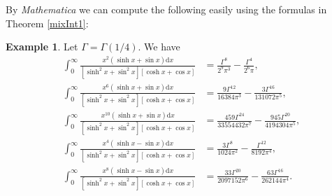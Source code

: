 \documentclass[11pt]{article}
\theoremstyle{plain}
\theoremstyle{definition}
\newtheorem{exa}[thm]{Example}
\begin{document}
By \emph{Mathematica} we can compute the following easily using the formulas in Theorem \ref{mixInt1}:
\begin{exa}\label{ExampleC}
Let $\Gamma=\Gamma(1/4)$. We have
	\begin{align}
	\int_0^{\infty}{\frac{x^2\left( \sinh x+\sin x \right) \mathrm{d}x}{\left[ \sinh ^2x+\sin ^2x \right] \left[ \cosh x+\cos x \right]}}&=\frac{\Gamma ^8}{2^9\pi ^3}-\frac{\Gamma ^4}{2^6\pi},
	\nonumber\\
	\int_0^{\infty}{\frac{x^6\left( \sinh x+\sin x \right) \mathrm{d}x}{\left[ \sinh ^2x+\sin ^2x \right] \left[ \cosh x+\cos x \right]}}&=\frac{9\Gamma  ^{12}}{16384\pi ^3}-\frac{3\Gamma  ^{16}}{131072\pi ^5},
	\nonumber\\
	\int_0^{\infty}{\frac{x^{10}\left( \sinh x+\sin x \right) \mathrm{d}x}{\left[ \sinh ^2x+\sin ^2x \right] \left[ \cosh x+\cos x \right]}}&=\frac{459\Gamma  ^{24}}{33554432\pi ^7}-\frac{945\Gamma  ^{20}}{4194304\pi ^5},
	\nonumber\\
	\int_0^{\infty}{\frac{x^4\left( \sinh x-\sin x \right) \mathrm{d}x}{\left[ \sinh ^2x+\sin ^2x \right] \left[ \cosh x+\cos x \right]}}&=\frac{3\Gamma  ^8}{1024\pi ^2}-\frac{\Gamma ^{12}}{8192\pi ^4},
	\nonumber\\
	\int_0^{\infty}{\frac{x^{8}\left( \sinh x-\sin x \right) \mathrm{d}x}{\left[ \sinh ^2x+\sin ^2x \right] \left[ \cosh x+\cos x \right]}}&=\frac{33\Gamma  ^{20}}{2097152\pi ^6}-\frac{63\Gamma  ^{16}}{262144\pi ^4}.	\nonumber\
	\end{align}
\end{exa}
\end{document}
